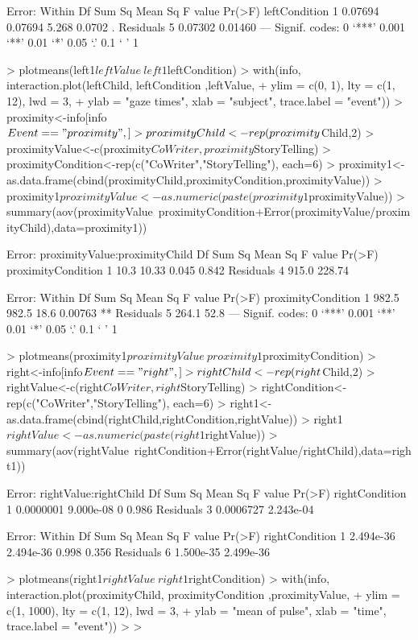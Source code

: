\documentclass{article}
\begin{document}
\begin{Schunk}
\begin{Soutput}
Error: Within
              Df  Sum Sq Mean Sq F value Pr(>F)  
leftCondition  1 0.07694 0.07694   5.268 0.0702 .
Residuals      5 0.07302 0.01460                 
---
Signif. codes:  0 ‘***’ 0.001 ‘**’ 0.01 ‘*’ 0.05 ‘.’ 0.1 ‘ ’ 1
\end{Soutput}
\begin{Sinput}
> plotmeans(left1$leftValue~left1$leftCondition)
> with(info, interaction.plot(leftChild, leftCondition ,leftValue,
+   ylim = c(0, 1), lty = c(1, 12), lwd = 3,
+   ylab = "gaze times", xlab = "subject", trace.label = "event"))
> proximity<-info[info$Event=="proximity",]
> proximityChild<-rep(proximity$Child,2)
> proximityValue<-c(proximity$CoWriter,proximity$StoryTelling)
> proximityCondition<-rep(c("CoWriter","StoryTelling"), each=6)
> proximity1<-as.data.frame(cbind(proximityChild,proximityCondition,proximityValue))
> proximity1$proximityValue<-as.numeric(paste(proximity1$proximityValue))
> summary(aov(proximityValue~proximityCondition+Error(proximityValue/proximityChild),data=proximity1))
\end{Sinput}
\begin{Soutput}
Error: proximityValue:proximityChild
                   Df Sum Sq Mean Sq F value Pr(>F)
proximityCondition  1   10.3   10.33   0.045  0.842
Residuals           4  915.0  228.74               

Error: Within
                   Df Sum Sq Mean Sq F value  Pr(>F)   
proximityCondition  1  982.5   982.5    18.6 0.00763 **
Residuals           5  264.1    52.8                   
---
Signif. codes:  0 ‘***’ 0.001 ‘**’ 0.01 ‘*’ 0.05 ‘.’ 0.1 ‘ ’ 1
\end{Soutput}
\begin{Sinput}
> plotmeans(proximity1$proximityValue~proximity1$proximityCondition)
> right<-info[info$Event=="right",]
> rightChild<-rep(right$Child,2)
> rightValue<-c(right$CoWriter,right$StoryTelling)
> rightCondition<-rep(c("CoWriter","StoryTelling"), each=6)
> right1<-as.data.frame(cbind(rightChild,rightCondition,rightValue))
> right1$rightValue<-as.numeric(paste(right1$rightValue))
> summary(aov(rightValue~rightCondition+Error(rightValue/rightChild),data=right1))
\end{Sinput}
\begin{Soutput}
Error: rightValue:rightChild
               Df    Sum Sq   Mean Sq F value Pr(>F)
rightCondition  1 0.0000001 9.000e-08       0  0.986
Residuals       3 0.0006727 2.243e-04               

Error: Within
               Df    Sum Sq   Mean Sq F value Pr(>F)
rightCondition  1 2.494e-36 2.494e-36   0.998  0.356
Residuals       6 1.500e-35 2.499e-36               
\end{Soutput}
\begin{Sinput}
> plotmeans(right1$rightValue~right1$rightCondition)
> with(info, interaction.plot(proximityChild, proximityCondition ,proximityValue,
+   ylim = c(1, 1000), lty = c(1, 12), lwd = 3,
+   ylab = "mean of pulse", xlab = "time", trace.label = "event"))
> 
> 
\end{Sinput}
\end{Schunk}
\end{document}
